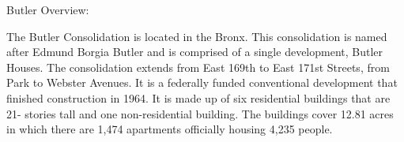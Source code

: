 Butler Overview:     

   

The Butler Consolidation is located in the Bronx. This consolidation is named after Edmund Borgia Butler and is comprised of a single development, Butler Houses. The consolidation extends from East 169th to East 171st Streets, from Park to Webster Avenues. It is a federally funded conventional development that finished construction in 1964. It is made up of six residential buildings that are 21- stories tall and one non-residential building. The buildings cover 12.81 acres in which there are 1,474 apartments officially housing 4,235 people. 